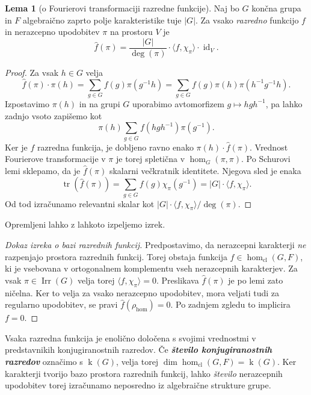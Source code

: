 \documentclass[11pt]{book}
\DeclareMathOperator\tr{tr}
\DeclareMathOperator\Irr{Irr}
\DeclareMathOperator\kk{k}
\DeclareMathOperator\cl{cl}
\DeclareMathOperator\id{id}
\def\definicija{\color{rdeca}\bf\em}
\theoremstyle{definition}
\theoremstyle{zgled}
\theoremstyle{odprtproblem}
\theoremstyle{domacanaloga}
\newenvironment{dokaz}
    {\color{siva}\begin{proof}}
    {\end{proof}}
\theoremstyle{izrek}
\newtheorem*{lema}{Lema}
\begin{document}
\begin{lema}[o Fourierovi transformaciji razredne funkcije]
Naj bo $G$ končna grupa in $F$ algebraično zaprto polje karakteristike tuje $|G|$. Za vsako \emph{razredno} funkcijo $f$ in nerazcepno upodobitev $\pi$ na prostoru $V$ je 
\[
    \hat{f}(\pi) = 
    \frac{|G|}{\deg(\pi)} \cdot \langle f, \chi_{\pi} \rangle \cdot {\textstyle \id_V}.
\]
\end{lema}
\begin{dokaz}
Za vsak $h \in G$ velja
\[
    \hat{f}(\pi) \cdot \pi(h) =  \sum_{g \in G} f(g) \pi(g^{-1}h)
    =  \sum_{g \in G} f(g) \pi(h) \pi(h^{-1}g^{-1}h).
\]
Izpostavimo $\pi(h)$ in na grupi $G$ uporabimo avtomorfizem $g \mapsto h g h^{-1}$, pa lahko zadnjo vsoto zapišemo kot
\[
    \pi(h)  \sum_{g \in G} f(hgh^{-1}) \pi(g^{-1}).
\]
Ker je $f$ razredna funkcija, je dobljeno ravno enako $\pi(h) \cdot \hat{f}(\pi)$. Vrednost Fourierove transformacije v $\pi$ je torej spletična v $\hom_G(\pi, \pi)$. Po Schurovi lemi sklepamo, da je $\hat{f}(\pi)$ skalarni večkratnik identitete. Njegova sled je enaka
\[
    \tr \left( \hat{f}(\pi) \right) =  \sum_{g \in G} f(g) \chi_{\pi}(g^{-1}) = |G| \cdot \langle f, \chi_{\pi} \rangle.
\]
Od tod izračunamo relevantni skalar kot $|G| \cdot \langle f, \chi_{\pi} \rangle/\deg(\pi)$.
\end{dokaz}

Opremljeni lahko z lahkoto izpeljemo izrek.

\begin{dokaz}[Dokaz izreka o bazi razrednih funkcij]
Predpostavimo, da nerazcepni karakterji \emph{ne} razpenjajo prostora razrednih funkcij. Torej obstaja funkcija $f \in \hom_{\cl}(G,F)$, ki je vsebovana v ortogonalnem komplementu vseh nerazcepnih karakterjev. Za vsak $\pi \in \Irr(G)$ velja torej $\langle f, \chi_{\pi} \rangle = 0$. Preslikava $\hat{f}(\pi)$ je po lemi zato ničelna. Ker to velja za vsako nerazcepno upodobitev, mora veljati tudi za regularno upodobitev, se pravi $\hat{f}(\rho_{\hom}) = 0$. Po zadnjem zgledu to implicira $f = 0$. 
\end{dokaz}

Vsaka razredna funkcija je enolično določena s svojimi vrednostmi v predstavnikih konjugiranostnih razredov. Če {\definicija število konjugiranostnih razredov} označimo s $\kk(G)$, velja torej $\dim \hom_{\cl}(G,F) = \kk(G)$. Ker karakterji tvorijo bazo prostora razrednih funkcij, lahko \emph{število} nerazcepnih upodobitev torej izračunamo neposredno iz algebraične strukture grupe.
\end{document}
